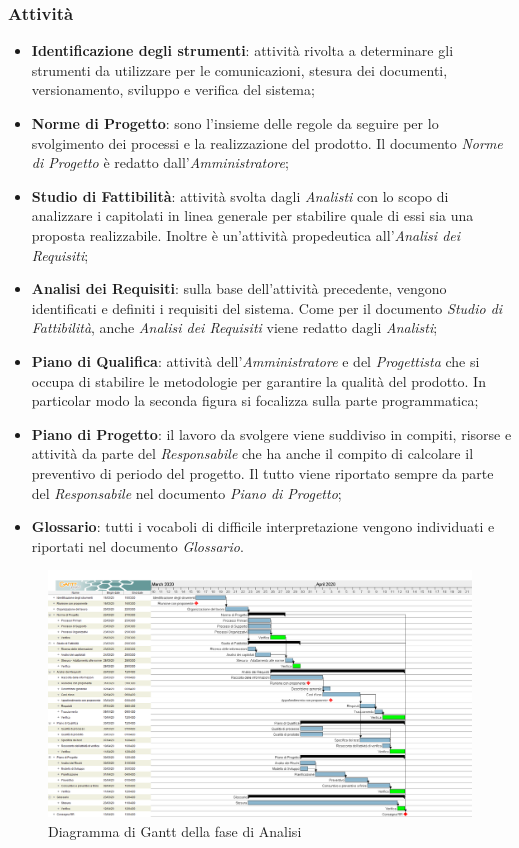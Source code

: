 \subsubsection{Attività}
\begin{itemize}
\item \textbf{Identificazione degli strumenti}: attività rivolta a determinare gli strumenti da utilizzare per le comunicazioni, stesura dei documenti, versionamento, sviluppo e verifica del sistema;
\item \textbf{Norme di Progetto}: sono l'insieme delle regole da seguire per lo svolgimento dei processi e la realizzazione del prodotto. Il documento \textit{Norme di Progetto} è redatto dall'\textit{Amministratore};
\item \textbf{Studio di Fattibilità}: attività svolta dagli \textit{Analisti} con lo scopo di analizzare i capitolati in linea generale per stabilire quale di essi sia una proposta realizzabile. Inoltre è un'attività propedeutica all'\textit{Analisi dei Requisiti};
\item \textbf{Analisi dei Requisiti}: sulla base dell'attività precedente, vengono identificati e definiti i requisiti del sistema. Come per il documento \textit{Studio di Fattibilità}, anche \textit{Analisi dei Requisiti} viene redatto dagli \textit{Analisti};
\item \textbf{Piano di Qualifica}: attività dell'\textit{Amministratore} e del \textit{Progettista} che si occupa di stabilire le metodologie per garantire la qualità del prodotto. In particolar modo la seconda figura si focalizza sulla parte programmatica;
\item \textbf{Piano di Progetto}: il lavoro da svolgere viene suddiviso in compiti, risorse e attività da parte del \textit{Responsabile} che ha anche il compito di calcolare il preventivo di periodo del progetto. Il tutto viene riportato sempre da parte del \textit{Responsabile} nel documento \textit{Piano di Progetto};
\item \textbf{Glossario}: tutti i vocaboli di difficile interpretazione vengono individuati e riportati nel documento \textit{Glossario}.
\end{itemize}

\begin{figure}[H]
\centering
\includegraphics[scale=0.24]{./img/gantt/analisi.png}
\caption{Diagramma di Gantt della fase di Analisi}
\end{figure}

